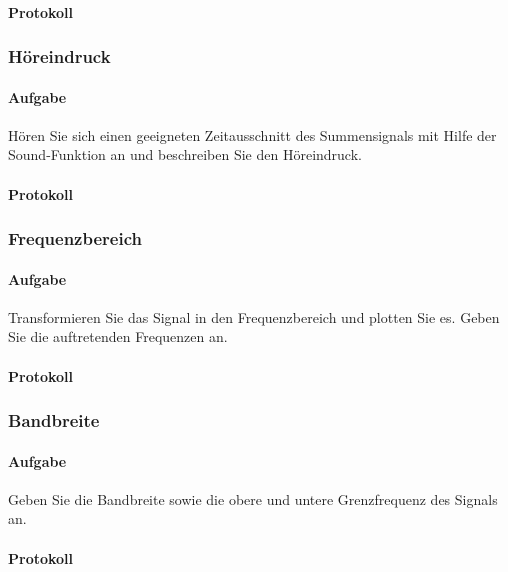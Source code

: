 \documentclass[10pt]{report}
\begin{document}
        \paragraph{Protokoll}

        \subsubsection{Höreindruck}
        \paragraph{Aufgabe}
        Hören Sie sich einen geeigneten Zeitausschnitt des Summensignals mit Hilfe der
        \glqq{}Sound\grqq{}-Funktion an und beschreiben Sie den Höreindruck.
        \paragraph{Protokoll}

        \subsubsection{Frequenzbereich}
        \paragraph{Aufgabe}
        Transformieren Sie das Signal in den Frequenzbereich und plotten Sie es. Geben Sie
        die auftretenden Frequenzen an.
        \paragraph{Protokoll}

        \subsubsection{Bandbreite}
        \paragraph{Aufgabe}
        Geben Sie die Bandbreite sowie die obere und untere Grenzfrequenz des Signals an.
        \paragraph{Protokoll}
\end{document}
